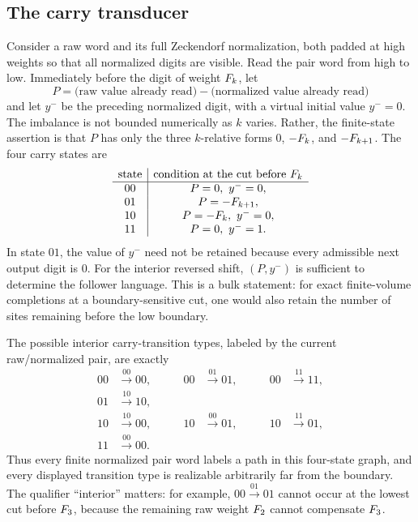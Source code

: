 \subsection{The carry transducer}

Consider a raw word and its full Zeckendorf normalization, both padded at high weights so that all normalized digits are visible. Read the pair word from high to low. Immediately before the digit of weight \(F_k\), let
\[
P=\text{(raw value already read)}-\text{(normalized value already read)}
\]
and let \(y^-\) be the preceding normalized digit, with a virtual initial value \(y^-=0\). The imbalance is not bounded numerically as \(k\) varies. Rather, the finite-state assertion is that \(P\) has only the three \(k\)-relative forms \(0\), \(-F_k\), and \(-F_{k+1}\). The four carry states are
\[
\begin{array}{c|c}
\text{state}&\text{condition at the cut before }F_k\\\hline
00&P=0,\ y^-=0,\\
01&P=-F_{k+1},\\
10&P=-F_k,\ y^-=0,\\
11&P=0,\ y^-=1.
\end{array}
\]
In state \(01\), the value of \(y^-\) need not be retained because every admissible next output digit is \(0\).
For the interior reversed shift, \((P,y^-)\) is sufficient to determine the follower language. This is a bulk statement: for exact finite-volume completions at a boundary-sensitive cut, one would also retain the number of sites remaining before the low boundary.

\begin{proposition}\label{prop:transitions}
The possible interior carry-transition types, labeled by the current raw/normalized pair, are exactly
\begin{align*}
00 &\xrightarrow{00} 00, &\qquad
00 &\xrightarrow{01} 01, &\qquad
00 &\xrightarrow{11} 11,\\
01 &\xrightarrow{10} 10,\\
10 &\xrightarrow{10} 00, &\qquad
10 &\xrightarrow{00} 01, &\qquad
10 &\xrightarrow{11} 01,\\
11 &\xrightarrow{00} 00.
\end{align*}
Thus every finite normalized pair word labels a path in this four-state graph, and every displayed transition type is realizable arbitrarily far from the boundary. The qualifier ``interior'' matters: for example, \(00\xrightarrow{01}01\) cannot occur at the lowest cut before \(F_3\), because the remaining raw weight \(F_2\) cannot compensate \(F_3\).
\end{proposition}

